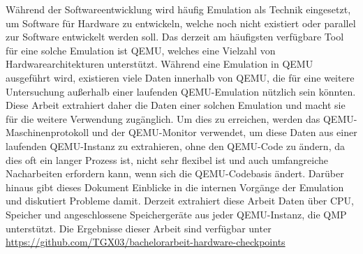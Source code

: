 
\Abstract
Während der Softwareentwicklung wird häufig Emulation als Technik eingesetzt,
um Software für Hardware zu entwickeln, welche noch nicht existiert oder parallel zur Software entwickelt werden soll.
Das derzeit am häufigsten verfügbare Tool für eine solche Emulation ist QEMU, welches eine Vielzahl von Hardwarearchitekturen unterstützt.
Während eine Emulation in QEMU ausgeführt wird,
existieren viele Daten innerhalb von QEMU, die für eine weitere Untersuchung außerhalb einer laufenden QEMU-Emulation nützlich sein könnten.
Diese Arbeit extrahiert daher die Daten einer solchen Emulation und macht sie für die weitere Verwendung zugänglich.
Um dies zu erreichen, werden das QEMU-Maschinenprotokoll und der QEMU-Monitor verwendet, um diese Daten aus einer laufenden QEMU-Instanz zu extrahieren,
ohne den QEMU-Code zu ändern, da dies oft ein langer Prozess ist,
nicht sehr flexibel ist und auch umfangreiche Nacharbeiten erfordern kann, wenn sich die QEMU-Codebasis ändert.
Darüber hinaus gibt dieses Dokument Einblicke in die internen Vorgänge der Emulation und diskutiert Probleme damit.
Derzeit extrahiert diese Arbeit Daten über CPU, Speicher und angeschlossene Speichergeräte aus jeder QEMU-Instanz, die QMP unterstützt.
Die Ergebnisse dieser Arbeit sind verfügbar unter \url{https://github.com/TGX03/bachelorarbeit-hardware-checkpoints}
